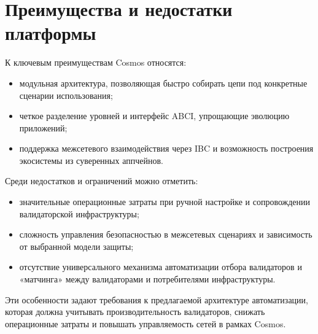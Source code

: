 \section{Преимущества и недостатки платформы}\label{sec:ch2/sec2}

К ключевым преимуществам Cosmos относятся:
\begin{itemize}
  \item модульная архитектура, позволяющая быстро собирать цепи под конкретные
  сценарии использования;
  \item четкое разделение уровней и интерфейс ABCI, упрощающие эволюцию приложений;
  \item поддержка межсетевого взаимодействия через IBC и возможность построения
  экосистемы из суверенных аппчейнов.
\end{itemize}

Среди недостатков и ограничений можно отметить:
\begin{itemize}
  \item значительные операционные затраты при ручной настройке и сопровождении
  валидаторской инфраструктуры;
  \item сложность управления безопасностью в межсетевых сценариях и зависимость
  от выбранной модели защиты;
  \item отсутствие универсального механизма автоматизации отбора валидаторов и
  «матчинга» между валидаторами и потребителями инфраструктуры.
\end{itemize}

Эти особенности задают требования к предлагаемой архитектуре автоматизации,
которая должна учитывать производительность валидаторов, снижать операционные
затраты и повышать управляемость сетей в рамках Cosmos.
